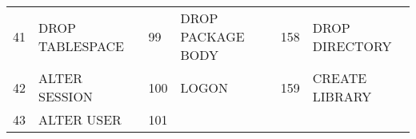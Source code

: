 \begin{longtable}[]{@{}llllll@{}}
\begin{minipage}[t]{0.06\columnwidth}\raggedright\strut
41\strut
\end{minipage} & \begin{minipage}[t]{0.19\columnwidth}\raggedright\strut
DROP TABLESPACE\strut
\end{minipage} & \begin{minipage}[t]{0.06\columnwidth}\raggedright\strut
99\strut
\end{minipage} & \begin{minipage}[t]{0.24\columnwidth}\raggedright\strut
DROP PACKAGE BODY\strut
\end{minipage} & \begin{minipage}[t]{0.06\columnwidth}\raggedright\strut
158\strut
\end{minipage} & \begin{minipage}[t]{0.24\columnwidth}\raggedright\strut
DROP DIRECTORY\strut
\end{minipage}\tabularnewline
\begin{minipage}[t]{0.06\columnwidth}\raggedright\strut
42\strut
\end{minipage} & \begin{minipage}[t]{0.19\columnwidth}\raggedright\strut
ALTER SESSION\strut
\end{minipage} & \begin{minipage}[t]{0.06\columnwidth}\raggedright\strut
100\strut
\end{minipage} & \begin{minipage}[t]{0.24\columnwidth}\raggedright\strut
LOGON\strut
\end{minipage} & \begin{minipage}[t]{0.06\columnwidth}\raggedright\strut
159\strut
\end{minipage} & \begin{minipage}[t]{0.24\columnwidth}\raggedright\strut
CREATE LIBRARY\strut
\end{minipage}\tabularnewline
\begin{minipage}[t]{0.06\columnwidth}\raggedright\strut
43\strut
\end{minipage} & \begin{minipage}[t]{0.19\columnwidth}\raggedright\strut
ALTER USER\strut
\end{minipage} & \begin{minipage}[t]{0.06\columnwidth}\raggedright\strut
101\strut
\end{minipage} & \begin{minipage}[t]{0.24\columnwidth}\raggedright\strut

\end{minipage}
\end{longtable}
